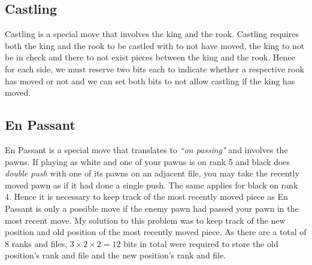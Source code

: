 \subsection{Castling}
Castling is a special move that involves the king and the rook. Castling requires both the king and the rook to be castled with to not have moved, the king to not be in check and there to not exist pieces between the king and the rook. Hence for each side, we must reserve two bits each to indicate whether a respective rook has moved or not and we can set both bits to not allow castling if the king has moved.
\subsection{En Passant}
En Passant is a special move that translates to \textit{``on passing"} and involves the pawns. If playing as white and one of your pawns is on rank 5 and black does \textit{double push} with one of its pawns on an adjacent file, you may take the recently moved pawn as if it had done a single push. The same applies for black on rank 4. Hence it is necessary to keep track of the most recently moved piece as En Passant is only a possible move if the enemy pawn had passed your pawn in the most recent move. My solution to this problem was to keep track of the new position and old position of the most recently moved piece. As there are a total of 8 ranks and files, $3\times 2\times 2 = 12$ bits in total were required to store the old position's rank and file and the new position's rank and file.
